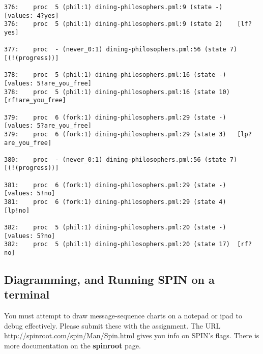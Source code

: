 \documentclass[11pt]{article}
\begin{document}
\begin{enumerate}
\begin{scriptsize}
\begin{verbatim}
376:    proc  5 (phil:1) dining-philosophers.pml:9 (state -)    [values: 4?yes]
376:    proc  5 (phil:1) dining-philosophers.pml:9 (state 2)    [lf?yes]

377:    proc  - (never_0:1) dining-philosophers.pml:56 (state 7)        [(!(progress))]

378:    proc  5 (phil:1) dining-philosophers.pml:16 (state -)   [values: 5!are_you_free]
378:    proc  5 (phil:1) dining-philosophers.pml:16 (state 10)  [rf!are_you_free]

379:    proc  6 (fork:1) dining-philosophers.pml:29 (state -)   [values: 5?are_you_free]
379:    proc  6 (fork:1) dining-philosophers.pml:29 (state 3)   [lp?are_you_free]

380:    proc  - (never_0:1) dining-philosophers.pml:56 (state 7)        [(!(progress))]

381:    proc  6 (fork:1) dining-philosophers.pml:29 (state -)   [values: 5!no]
381:    proc  6 (fork:1) dining-philosophers.pml:29 (state 4)   [lp!no]

382:    proc  5 (phil:1) dining-philosophers.pml:20 (state -)   [values: 5?no]
382:    proc  5 (phil:1) dining-philosophers.pml:20 (state 17)  [rf?no]
    \end{verbatim}
    \end{scriptsize}
\end{enumerate}


    \clearpage
    
\subsection*{Diagramming, and Running SPIN on a terminal}

You must attempt to draw message-sequence charts on a notepad or ipad to debug effectively.
Please submit these with the assignment.
The URL \url{http://spinroot.com/spin/Man/Spin.html} gives you info on SPIN's flags.
There is more documentation on the {\bf spinroot} page.
\end{document}
